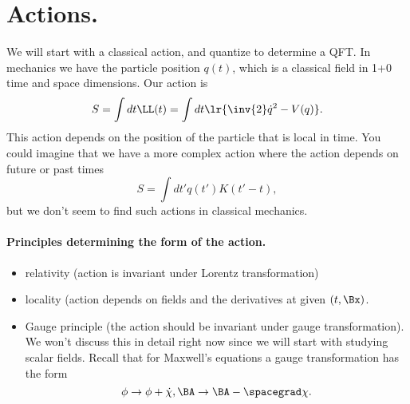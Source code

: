 \section{Actions.}
We will start with a classical action, and quantize to determine a QFT.
In mechanics we have the particle position \( q(t) \), which is a classical field in 1+0 time and space dimensions.  Our action is
\begin{dmath}\label{eqn:qftLecture3:360}
S
= \int dt \LL(t)
= \int dt \lr{
\inv{2} \dot{q}^2 - V(q)
}.
\end{dmath}
This action depends on the position of the particle that is local in time.
You could imagine that we have a more complex action where the action depends on future or past times
\begin{dmath}\label{eqn:qftLecture3:380}
S
= \int dt' q(t') K( t' - t ),
\end{dmath}
but we don't seem to find such actions in classical mechanics.

\paragraph{Principles determining the form of the action.}
\begin{itemize}
\item relativity (action is invariant under Lorentz transformation)
\item locality (action depends on fields and the derivatives at given \((t, \Bx)\).
\item Gauge principle (the action should be invariant under gauge transformation).  We won't discuss this in detail right now since we will start with studying scalar fields.
Recall that for Maxwell's equations a gauge transformation has the form
\begin{dmath}\label{eqn:qftLecture3:520}
\phi \rightarrow \phi + \dot{\chi}, \BA \rightarrow \BA - \spacegrad \chi.
\end{dmath}
\end{itemize}

